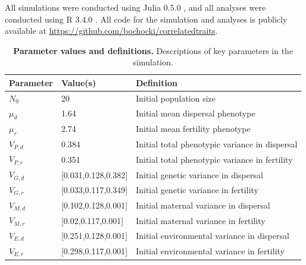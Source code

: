 \documentclass[11pt]{article}
\begin{document}
All simulations were conducted using Julia 0.5.0 \citep{bezanson_julia:_2017}, and all analyses were conducted using R 3.4.0 \citep{r_core_team_r:_2015}.
All code for the simulation and analyses is publicly available at \url{https://github.com/bochocki/correlatedtraits}.

\renewcommand{\thetable}{A\arabic{table}}
\setcounter{table}{0}
\begin{table}[h]
\centering
\label{Parameter values and definitions}
\caption[Parameter values and definitions]{\textbf{Parameter values and definitions.} Descriptions of key parameters in the simulation.}\label{corr:params}\vspace{0.1in}
\begin{tabularx}{0.95\linewidth}{llX}
\toprule
Parameter    & Value(s)                               & Definition                                        \\ \midrule
$N_{0}$      & 20                                     & Initial population size                           \\
$\mu_{d}$    & 1.64                                   & Initial mean dispersal phenotype   \\
$\mu_{r}$    & 2.74                                   & Initial mean fertility phenotype
\\
$V_{P,d}$    & 0.384                                   & Initial total phenotypic variance in dispersal \\
$V_{P,r}$    & 0.351                                   & Initial total phenotypic variance in fertility \\
$V_{G,d}$    & [0.031,0.128,0.382]                     & Initial genetic variance in dispersal \\
$V_{G,r}$    & [0.033,0.117,0.349]                     & Initial genetic variance in fertility \\
$V_{M,d}$    & [0.102,0.128,0.001]                     & Initial maternal variance in dispersal \\
$V_{M,r}$    & [0.02,0.117,0.001]                                  & Initial maternal variance in fertility \\
$V_{E,d}$    & [0.251,0.128,0.001]                                  & Initial environmental variance in dispersal \\
$V_{E,r}$    & [0.298,0.117,0.001]                                  & Initial environmental variance in fertility \\


\end{tabularx}
\end{table}
\end{document}
